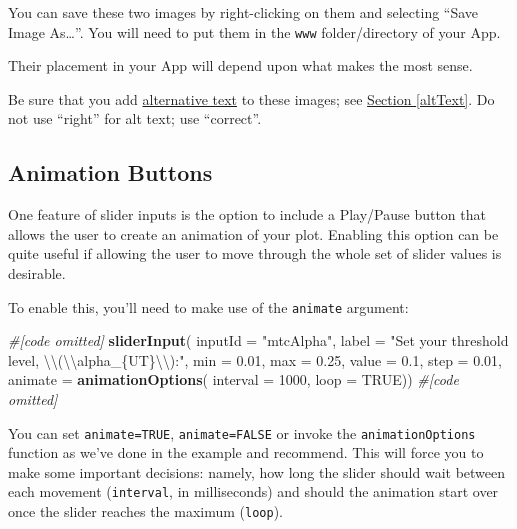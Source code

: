 \documentclass[
]{book}
\newenvironment{Shaded}{\begin{snugshade}}{\end{snugshade}}
\newcommand{\CharTok}[1]{\textcolor[rgb]{0.31,0.60,0.02}{#1}}
\newcommand{\CommentTok}[1]{\textcolor[rgb]{0.56,0.35,0.01}{\textit{#1}}}
\newcommand{\DataTypeTok}[1]{\textcolor[rgb]{0.13,0.29,0.53}{#1}}
\newcommand{\DecValTok}[1]{\textcolor[rgb]{0.00,0.00,0.81}{#1}}
\newcommand{\FloatTok}[1]{\textcolor[rgb]{0.00,0.00,0.81}{#1}}
\newcommand{\KeywordTok}[1]{\textcolor[rgb]{0.13,0.29,0.53}{\textbf{#1}}}
\newcommand{\NormalTok}[1]{#1}
\newcommand{\OtherTok}[1]{\textcolor[rgb]{0.56,0.35,0.01}{#1}}
\newcommand{\StringTok}[1]{\textcolor[rgb]{0.31,0.60,0.02}{#1}}
\begin{document}
You can save these two images by right-clicking on them and selecting ``Save Image As\ldots{}''. You will need to put them in the \texttt{www} folder/directory of your App.

Their placement in your App will depend upon what makes the most sense.

Be sure that you add \protect\hyperlink{altText}{alternative text} to these images; see \protect\hyperlink{altText}{Section \ref{altText}}. Do not use ``right'' for alt text; use ``correct''.

\hypertarget{animation-buttons}{%
\subsection{Animation Buttons}\label{animation-buttons}}

One feature of slider inputs is the option to include a Play/Pause button that allows the user to create an animation of your plot. Enabling this option can be quite useful if allowing the user to move through the whole set of slider values is desirable.

To enable this, you'll need to make use of the \texttt{animate} argument:

\begin{Shaded}
\begin{Highlighting}[]
\CommentTok{#[code omitted]}
\KeywordTok{sliderInput}\NormalTok{(}
  \DataTypeTok{inputId =} \StringTok{"mtcAlpha"}\NormalTok{,}
  \DataTypeTok{label =} \StringTok{"Set your threshold level, }\CharTok{\textbackslash{}\textbackslash{}}\StringTok{(}\CharTok{\textbackslash{}\textbackslash{}}\StringTok{alpha_\{UT\}}\CharTok{\textbackslash{}\textbackslash{}}\StringTok{):"}\NormalTok{,}
  \DataTypeTok{min =} \FloatTok{0.01}\NormalTok{,}
  \DataTypeTok{max =} \FloatTok{0.25}\NormalTok{,}
  \DataTypeTok{value =} \FloatTok{0.1}\NormalTok{,}
  \DataTypeTok{step =} \FloatTok{0.01}\NormalTok{,}
  \DataTypeTok{animate =} \KeywordTok{animationOptions}\NormalTok{(}
    \DataTypeTok{interval =} \DecValTok{1000}\NormalTok{, }\DataTypeTok{loop =} \OtherTok{TRUE}\NormalTok{))}
\CommentTok{#[code omitted]}
\end{Highlighting}
\end{Shaded}

You can set \texttt{animate=TRUE}, \texttt{animate=FALSE} or invoke the \texttt{animationOptions} function as we've done in the example and recommend. This will force you to make some important decisions: namely, how long the slider should wait between each movement (\texttt{interval}, in milliseconds) and should the animation start over once the slider reaches the maximum (\texttt{loop}).
\end{document}
